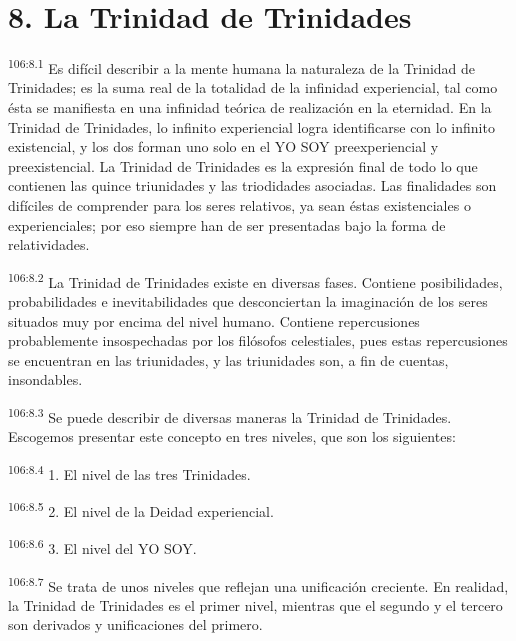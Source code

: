 \documentclass[twoside, 11pt]{book}
\begin{document}
\section*{8. La Trinidad de Trinidades}
\par
\textsuperscript{106:8.1} Es difícil describir a la mente humana la naturaleza de la Trinidad de Trinidades; es la suma real de la totalidad de la infinidad experiencial, tal como ésta se manifiesta en una infinidad teórica de realización en la eternidad. En la Trinidad de Trinidades, lo infinito experiencial logra identificarse con lo infinito existencial, y los dos forman uno solo en el YO SOY preexperiencial y preexistencial. La Trinidad de Trinidades es la expresión final de todo lo que contienen las quince triunidades y las triodidades asociadas. Las finalidades son difíciles de comprender para los seres relativos, ya sean éstas existenciales o experienciales; por eso siempre han de ser presentadas bajo la forma de relatividades.

\par
\textsuperscript{106:8.2} La Trinidad de Trinidades existe en diversas fases. Contiene posibilidades, probabilidades e inevitabilidades que desconciertan la imaginación de los seres situados muy por encima del nivel humano. Contiene repercusiones probablemente insospechadas por los filósofos celestiales, pues estas repercusiones se encuentran en las triunidades, y las triunidades son, a fin de cuentas, insondables.

\par
\textsuperscript{106:8.3} Se puede describir de diversas maneras la Trinidad de Trinidades. Escogemos presentar este concepto en tres niveles, que son los siguientes:

\par
\textsuperscript{106:8.4} 1. El nivel de las tres Trinidades.

\par
\textsuperscript{106:8.5} 2. El nivel de la Deidad experiencial.

\par
\textsuperscript{106:8.6} 3. El nivel del YO SOY.

\par
\textsuperscript{106:8.7} Se trata de unos niveles que reflejan una unificación creciente. En realidad, la Trinidad de Trinidades es el primer nivel, mientras que el segundo y el tercero son derivados y unificaciones del primero.
\end{document}
